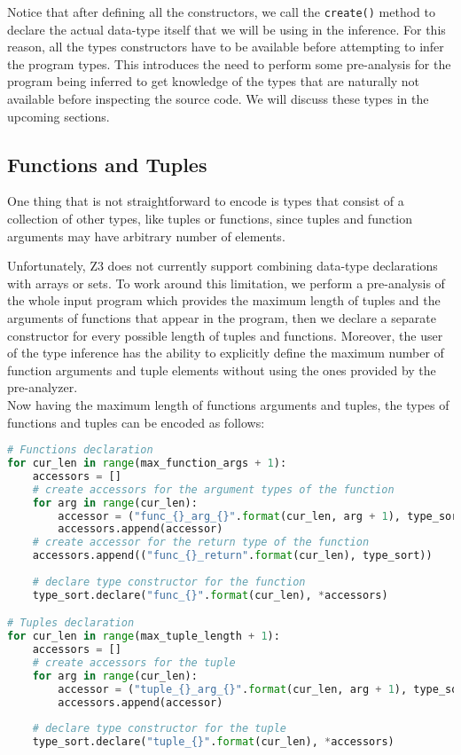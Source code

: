 Notice that after defining all the constructors, we call the \lstinline|create()| method to declare the actual data-type itself that we will be using in the inference. For this reason, all the types constructors have to be available before attempting to infer the program types. This introduces the need to perform some pre-analysis for the program being inferred to get knowledge of the types that are naturally not available before inspecting the source code. We will discuss these types in the upcoming sections.

\subsection{Functions and Tuples}
One thing that is not straightforward to encode is types that consist of a collection of other types, like tuples or functions, since tuples and function arguments may have arbitrary number of elements.

Unfortunately, Z3 does not currently support combining data-type declarations with arrays or sets. To work around this limitation, we perform a pre-analysis of the whole input program which provides the maximum length of tuples and the arguments of functions that appear in the program, then we declare a separate constructor for every possible length of tuples and functions. Moreover, the user of the type inference has the ability to explicitly define the maximum number of function arguments and tuple elements without using the ones provided by the pre-analyzer.\\

Now having the maximum length of functions arguments and tuples, the types of functions and tuples can be encoded as follows:

\begin{lstlisting}[language=python]
# Functions declaration
for cur_len in range(max_function_args + 1):
    accessors = []
    # create accessors for the argument types of the function
    for arg in range(cur_len):
	    accessor = ("func_{}_arg_{}".format(cur_len, arg + 1), type_sort)
	    accessors.append(accessor)
    # create accessor for the return type of the function
    accessors.append(("func_{}_return".format(cur_len), type_sort))
    
    # declare type constructor for the function
    type_sort.declare("func_{}".format(cur_len), *accessors)

# Tuples declaration
for cur_len in range(max_tuple_length + 1):
    accessors = []
    # create accessors for the tuple
    for arg in range(cur_len):
		accessor = ("tuple_{}_arg_{}".format(cur_len, arg + 1), type_sort)
	    accessors.append(accessor)
	    
    # declare type constructor for the tuple
    type_sort.declare("tuple_{}".format(cur_len), *accessors)
\end{lstlisting}

